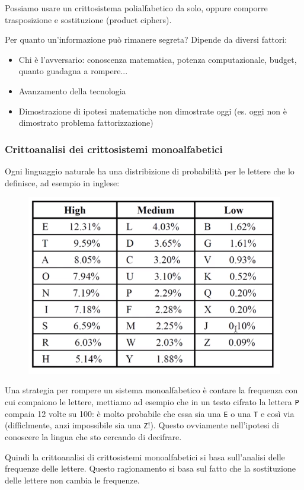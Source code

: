 Possiamo usare un crittosistema polialfabetico da solo, oppure comporre trasposizione e sostituzione (product ciphers).

Per quanto un'informazione può rimanere segreta? Dipende da diversi fattori:
\begin{itemize}
	\item Chi è l'avversario: conoscenza matematica, potenza computazionale, budget, quanto guadagna a rompere...
	\item Avanzamento della tecnologia
	\item Dimostrazione di ipotesi matematiche non dimostrate oggi (es. oggi non è dimostrato problema fattorizzazione)
\end{itemize}

\newpage

\subsubsection*{Crittoanalisi dei crittosistemi monoalfabetici}
Ogni linguaggio naturale ha una distribizione di probabilità per le lettere che lo definisce, ad esempio in inglese:

\begin{figure}[h]
	\centering
	\includegraphics[width=0.65\linewidth]{immagini/img32}
\end{figure}

Una strategia per rompere un sistema monoalfabetico è contare la frequenza con cui compaiono le lettere, mettiamo ad esempio che in un testo cifrato la lettera \texttt{P} compaia 12 volte su 100: è molto probabile che essa sia una \texttt{E} o una \texttt{T} e così via (difficlmente, anzi impossibile sia una \texttt{Z}!).
Questo ovviamente nell'ipotesi di conoscere la lingua che sto cercando di decifrare.

Quindi la crittoanalisi di crittosistemi monoalfabetici si basa sull'analisi delle frequenze delle lettere. Questo ragionamento si basa sul fatto che la sostituzione delle lettere non cambia le frequenze.

